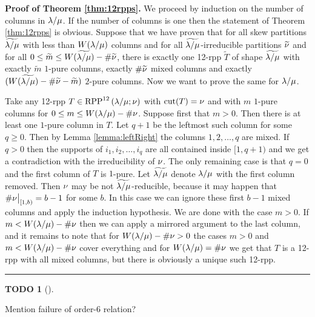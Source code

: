 \documentclass[numbers=enddot,12pt,final,onecolumn,notitlepage]{scrartcl}%
\theoremstyle{definition}
\newtheorem{quest}[theo]{TODO}
\newenvironment{todo}[1][]
{\begin{quest}[#1]\begin{leftbar}}
{\end{leftbar}\end{quest}}
\newenvironment{proof}[1][Proof]{\noindent\textbf{#1.} }{\ \rule{0.5em}{0.5em}}
\begin{document}
\begin{proof}[Proof of Theorem \ref{thm:12rpps}]
We proceed by induction on the number of columns in ${\lambda/\mu}$. If the number of columns is one then the statement of Theorem \ref{thm:12rpps} is obvious. Suppose that we have proven that for all skew partitions $\widetilde{{\lambda/\mu}}$ with less than $W({\lambda/\mu})$ columns and for all $\widetilde{{\lambda/\mu}}$-irreducible partitions $\widetilde{{{\nu}}}$ and for all $0\leq \widetilde m\leq W(\widetilde{{\lambda/\mu}})-\#\widetilde{{{\nu}}}$, there is exactly one 12-rpp $\widetilde T$ of shape $\widetilde{{\lambda/\mu}}$ with exactly $\widetilde m$ $1$-pure columns, exactly $\#\widetilde{{{\nu}}}$ mixed columns and exactly $(W(\widetilde{{\lambda/\mu}})-\#\widetilde{{{\nu}}}-\widetilde m)$ $2$-pure columns. Now we want to prove the same for ${\lambda/\mu}$.

Take any 12-rpp $T\in{\operatorname*{RPP}^{12}\left( \lambda/\mu ;{{\nu}}\right)}$ with ${\operatorname*{cut}}(T)={{\nu}}$ and with $m$ $1$-pure columns for $0\leq m\leq W({\lambda/\mu})-\#{{\nu}}$. Suppose first that $m>0$. Then there is at least one $1$-pure column in $T$. Let $q+1$ be the leftmost such column for some $q\geq 0$. Then by Lemma \ref{lemma:leftRight} the columns $1,2,\dots,q$ are mixed. If $q>0$ then the supports of $i_1,i_2,\dots,i_q$ are all contained inside $[1,q+1)$ and we get a contradiction with the irreducibility of ${{\nu}}$. The only remaining case is that $q=0$ and the first column of $T$ is $1$-pure. Let $\widetilde{{\lambda/\mu}}$ denote ${\lambda/\mu}$ with the first column removed. Then ${{\nu}}$ may be not $\widetilde{{\lambda/\mu}}$-reducible, because it may happen that $\#{{{\nu}}\big|_{[1,b)}}=b-1$ for some $b$. In this case we can ignore these first $b-1$ mixed columns and apply the induction hypothesis. We are done with the case $m>0$. If $m<W({\lambda/\mu})-\#{{\nu}}$ then we can apply a mirrored argument to the last column, and it remains to note that for $W({\lambda/\mu})-\#{{\nu}}>0$ the cases $m>0$ and $m<W({\lambda/\mu})-\#{{\nu}}$ cover everything and for $W({\lambda/\mu})=\#{{\nu}}$ we get that $T$ is a 12-rpp with all mixed columns, but there is obviously a unique such 12-rpp.
\end{proof}




\begin{todo}
Mention failure of order-$6$ relation?
\end{todo}
\end{document}
